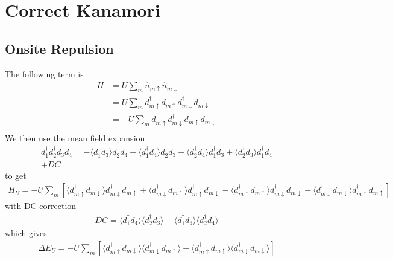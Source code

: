 \documentclass[11pt]{article}
\begin{document}
\section{Correct Kanamori}
\subsection{Onsite Repulsion}
The following term is
\begin{align}
    H &= U\sum_{m} \hat n_{m\uparrow} \hat n_{m\downarrow} \\\nonumber
    &= U \sum_{m} d^\dagger_{m\uparrow} d_{m\uparrow} d^\dagger_{m\downarrow} d_{m\downarrow} \\\nonumber
    &= -U \sum_{m} d^\dagger_{m\uparrow} d^\dagger_{m\downarrow} d_{m\uparrow} d_{m\downarrow} \\\nonumber
\end{align}
We then use the mean field expansion
\begin{align}
    d^\dagger_1 d^\dagger_2 d_3 d_4 = 
    -\langle d^\dagger_1 d_3 \rangle d^\dagger_2 d_4
    +\langle d^\dagger_1 d_4 \rangle d_2^\dagger d_3
    -\langle d^\dagger_2 d_4 \rangle d^\dagger_1 d_3
    + \langle d^\dagger_2 d_3 \rangle d^\dagger_1 d_4 \\\nonumber
    + DC
\end{align}
to get
\begin{align}
    H_U = -U\sum_m \left[
        \langle d^\dagger_{m\uparrow}d_{m\downarrow}\rangle d^\dagger_{m\downarrow}d_{m\uparrow}
        + \langle d^\dagger_{m\downarrow}d_{m\uparrow}\rangle d^\dagger_{m\uparrow}d_{m\downarrow}
        - \langle d^\dagger_{m\uparrow}d_{m\uparrow}\rangle d^\dagger_{m\downarrow}d_{m\downarrow}
        - \langle d^\dagger_{m\downarrow}d_{m\downarrow}\rangle d^\dagger_{m\uparrow}d_{m\uparrow}
    \right]
\end{align}
with DC correction
\begin{gather}
    DC = \langle d^\dagger_1 d_4\rangle\langle d^\dagger_2 d_3 \rangle 
    - \langle d^\dagger_1 d_3 \rangle \langle d^\dagger_2 d_4 \rangle
\end{gather}
which gives
\begin{align}
    \Delta E_U = -U \sum_m \left[\langle d^\dagger_{m\uparrow}d_{m\downarrow}\rangle \langle d^\dagger_{m\downarrow}d_{m\uparrow} \rangle
    - \langle d^\dagger_{m\uparrow}d_{m\uparrow}\rangle \langle d^\dagger_{m\downarrow}d_{m\downarrow} \rangle \right]
\end{align}
\end{document}
